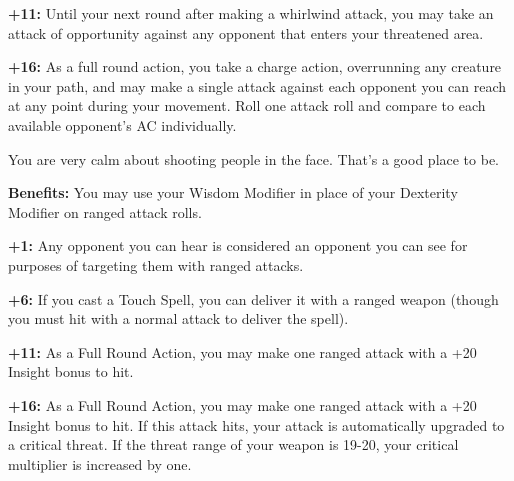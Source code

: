 \textbf{+11:} Until your next round after making a whirlwind attack, you may take an attack of opportunity against any opponent that enters your threatened area.

\textbf{+16:} As a full round action, you take a charge action, overrunning any creature in your path, and may make a single attack against each opponent you can reach at any point during your movement. Roll one attack roll and compare to each available opponent's AC individually.


You are very calm about shooting people in the face. That's a good place to be.

\textbf{Benefits:} You may use your Wisdom Modifier in place of your Dexterity Modifier on ranged attack rolls.

\textbf{+1:} Any opponent you can hear is considered an opponent you can see for purposes of targeting them with ranged attacks.

\textbf{+6:} If you cast a Touch Spell, you can deliver it with a ranged weapon (though you must hit with a normal attack to deliver the spell).

\textbf{+11:} As a Full Round Action, you may make one ranged attack with a +20 Insight bonus to hit.

\textbf{+16:} As a Full Round Action, you may make one ranged attack with a +20 Insight bonus to hit. If this attack hits, your attack is automatically upgraded to a critical threat. If the threat range of your weapon is 19-20, your critical multiplier is increased by one.

